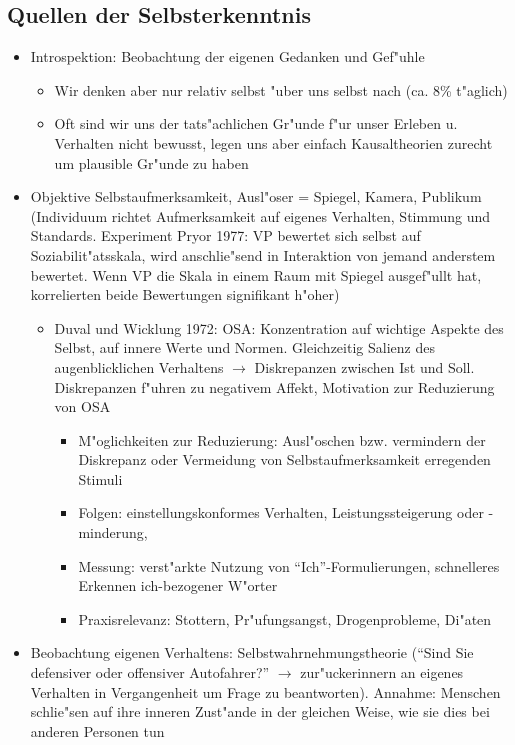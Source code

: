 \subsection{Quellen der Selbsterkenntnis}
\begin{itemize}
	\item
		Introspektion: Beobachtung der eigenen Gedanken und Gef"uhle
		\begin{itemize}
			\item
				Wir denken aber nur relativ selbst "uber uns selbst nach (ca. 8\% t"aglich)
			\item
				Oft sind wir uns der tats"achlichen Gr"unde f"ur unser Erleben u. Verhalten nicht bewusst, legen uns aber einfach Kausaltheorien zurecht um plausible Gr"unde zu haben
		\end{itemize}
	\item
		Objektive Selbstaufmerksamkeit, Ausl"oser = Spiegel, Kamera, Publikum (Individuum richtet Aufmerksamkeit auf eigenes Verhalten, Stimmung und Standards. Experiment Pryor 1977: VP bewertet sich selbst auf Soziabilit"atsskala, wird anschlie"send in Interaktion von jemand anderstem bewertet. Wenn VP die Skala in einem Raum mit Spiegel ausgef"ullt hat, korrelierten beide Bewertungen signifikant h"oher)
		\begin{itemize}
			\item
				Duval und Wicklung 1972: OSA: Konzentration auf wichtige Aspekte des Selbst, auf innere Werte und Normen. Gleichzeitig Salienz des augenblicklichen Verhaltens  $\rightarrow$ Diskrepanzen zwischen Ist und Soll. Diskrepanzen f"uhren zu negativem Affekt, Motivation zur Reduzierung von OSA
				\begin{itemize}
					\item
						M"oglichkeiten zur Reduzierung: Ausl"oschen bzw. vermindern der Diskrepanz oder Vermeidung von Selbstaufmerksamkeit erregenden Stimuli
					\item
						Folgen: einstellungskonformes Verhalten, Leistungssteigerung oder -minderung, 
					\item
						Messung: verst"arkte Nutzung von \enquote{Ich}-Formulierungen, schnelleres Erkennen ich-bezogener W"orter
					\item
						Praxisrelevanz: Stottern, Pr"ufungsangst, Drogenprobleme, Di"aten
				\end{itemize}
		\end{itemize}
	\item
		Beobachtung eigenen Verhaltens: Selbstwahrnehmungstheorie (\enquote{Sind Sie defensiver oder offensiver Autofahrer?}  $\rightarrow$ zur"uckerinnern an eigenes Verhalten in Vergangenheit um Frage zu beantworten). Annahme: Menschen schlie"sen auf ihre inneren Zust"ande in der gleichen Weise, wie sie dies bei anderen Personen tun

\end{itemize}
